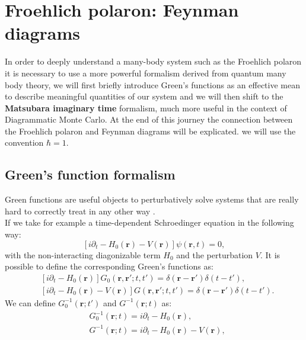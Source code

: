 \section{Froehlich polaron: Feynman diagrams}
In order to deeply understand a many-body system such as the Froehlich polaron it is necessary to use a more powerful formalism 
derived from quantum many body theory, we will first briefly introduce Green's functions as an effective mean to describe meaningful quantities of 
our system and we will then shift to the \textbf{Matsubara imaginary time} formalism, much more useful in the context of Diagrammatic Monte Carlo.
At the end of this journey the connection between the Froehlich polaron and Feynman diagrams will be explicated. %
we will use the convention $\hbar=1$.
\subsection{Green's function formalism}
Green functions are useful objects to perturbatively solve systems that are really hard to correctly treat in any other way \cite{bruus2004many}.\\
If we take for example a time-dependent Schroedinger equation in the following way:
\begin{equation}
    \left[i\partial_t - H_0(\mathbf{r})-V(\mathbf{r})\right]\psi(\mathbf{r},t)=0,
    \label{Schroedinger_eq_hamiltonian}
\end{equation}
with the non-interacting diagonizable term $H_0$ and the perturbation $V$. It is possible to define the corresponding Green's functions as:
\begin{equation}
\begin{split}
    &\left[i\partial_t -H_0(\mathbf{r})\right]G_0(\mathbf{r},\mathbf{r}';t,t')=\delta(\mathbf{r}-\mathbf{r}')\delta(t-t'),\\
    &\left[i\partial_t -H_0(\mathbf{r})-V(\mathbf{r})\right]G(\mathbf{r},\mathbf{r}';t,t')=\delta(\mathbf{r}-\mathbf{r}')\delta(t-t').
\end{split}
\end{equation}
We can define $G_0^{-1}(\mathbf{r};t')$ and $G^{-1}(\mathbf{r};t)$ as:
\begin{equation}
\begin{split}
    &G_0^{-1}(\mathbf{r};t)=i\partial_t-H_0(\mathbf{r}),\\
    &G^{-1}(\mathbf{r};t)=i\partial_t-H_0(\mathbf{r})-V(\mathbf{r}),
\end{split}
\label{GF_solving_eq}
\end{equation}
